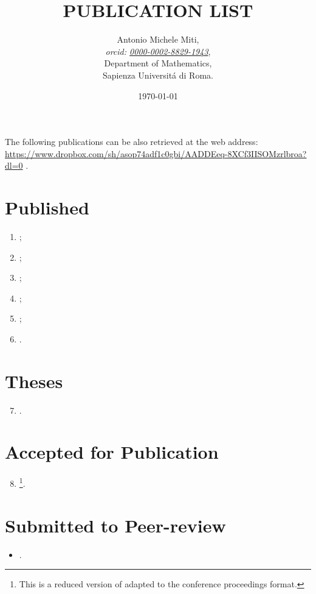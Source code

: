 \documentclass[a4paper]{article}
\title{PUBLICATION LIST}
\date{\today}
\author{
	Antonio Michele Miti,\\
	\emph{orcid: \href{https://orcid.org/0000-0002-8829-1943}{0000-0002-8829-1943}},
	\\
	Department of Mathematics,\\
	Sapienza Universit\'a di Roma.
}
\begin{document}
  

	\maketitle

	\noindent
  The following publications can be also retrieved at the web address:
  \\ 
  \url{https://www.dropbox.com/sh/asop74adf1c0gbi/AADDEeq-8XCf3IISOMzrlbroa?dl=0}
  .


  \section*{Published}
	  \begin{enumerate}
    	\item {};
		\item {};	  
		\item {};		
 		\item {};
 		\item {};
 		\item {}.
	  \end{enumerate}

  \section*{Theses}
	  \begin{enumerate}
		\setcounter{enumi}{6}
 	   \item {}.
	  \end{enumerate}

  \section*{Accepted for Publication}
	  \begin{enumerate}
		\setcounter{enumi}{7}
		\item {}\footnote{This is a reduced version of \cite{Luongo2024} adapted to the conference proceedings format.}.
	  \end{enumerate}

  \section*{Submitted to Peer-review}
	  \begin{itemize}
    	   \item {}.
	  \end{itemize}
\end{document}
